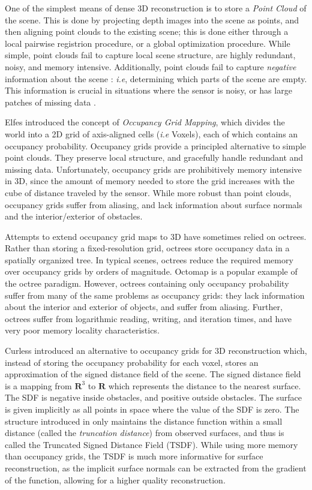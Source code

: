 One of the simplest means of dense 3D reconstruction is to  store a \emph{Point
Cloud} of the scene. This is done by projecting depth images into the scene as
points, and then aligning point clouds to the existing scene; this is done
either through a local pairwise registrion procedure, or a global optimization
procedure. While simple, point clouds fail to capture local scene structure, are highly 
redundant, noisy, and memory intensive.  Additionally, point clouds fail to
capture \emph{negative} information about the scene :  \emph{i.e}, determining
which parts of the scene are empty.  This information is crucial in situations
where the sensor is noisy, or has large patches of missing data \cite{Klingensmith2014}.

Elfes \cite{Elfes1989} introduced the concept of \emph{Occupancy Grid
Mapping}, which divides the world into a 2D grid of axis-aligned cells
(\emph{i.e} Voxels), each of which contains an occupancy probability. Occupancy
grids provide a principled alternative to simple point clouds. They preserve local
structure, and gracefully handle redundant and missing data.
Unfortunately, occupancy grids are prohibitively memory intensive in 3D, since
the amount of memory needed to store the grid increases with the cube of distance 
traveled by the sensor. While more robust than point clouds, occupancy grids
suffer from aliasing, and lack information about surface normals and the
interior/exterior of obstacles.

Attempts to extend occupancy grid maps to 3D have sometimes relied on octrees.
Rather than storing a fixed-resolution grid, octrees store occupancy data in a
spatially organized tree. In typical scenes, octrees reduce the required memory
over occupancy grids by orders of magnitude. Octomap \cite{Wurm2010} is a
popular example of the octree paradigm. However, octrees containing only
occupancy probability suffer from many of the same problems as occupancy grids:
they lack information about the interior and exterior of objects, and suffer
from aliasing. Further, octrees suffer from logarithmic reading, writing, and
iteration times, and have very poor memory locality characteristics.

Curless \cite{Curless1996} introduced an alternative to occupancy grids for 3D
reconstruction which, instead of storing the occupancy probability for each
voxel, stores an approximation of the signed distance field of the scene. The signed distance
field is a mapping from $\mathbf{R}^3$ to $\mathbf{R}$ which represents the
distance to the nearest surface. The SDF is negative inside obstacles, and
positive outside obstacles. The surface is given implicitly as all points in
space where the value of the SDF is zero. The structure introduced in
\cite{Curless1996} only maintains the distance function within a small distance 
(called the \emph{truncation distance}) from observed surfaces, and thus is called the
Truncated Signed Distance Field (TSDF).  While using more memory than occupancy
grids, the TSDF is much more informative for surface reconstruction, as the
implicit surface normals can be extracted from the gradient of the function,
allowing for a higher quality reconstruction.

